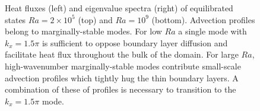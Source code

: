 \documentclass[twocolumn,showpacs,amsmath,amssymb]{revtex4}
\begin{document}
\begin{figure}[t]
    \centering
    \caption{Heat fluxes (left) and eigenvalue spectra (right) of equilibrated states $Ra = 2 \times 10^5$ (top) and $Ra = 10^9$ (bottom). Advection profiles belong to marginally-stable modes. For low $Ra$ a single mode with $k_x = 1.5\pi$ is sufficient to oppose  boundary layer diffusion and facilitate heat flux throughout the bulk of the domain. For large $Ra$, high-wavenumber marginally-stable modes contribute small-scale advection profiles which tightly hug the thin boundary layers. A combination of these of profiles is necessary to transition to the $k_x = 1.5\pi$ mode.}
    \label{fig:flux}
\end{figure}
\end{document}
